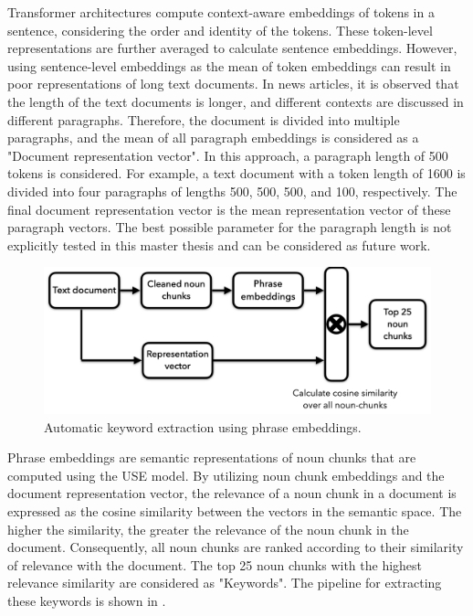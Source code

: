 Transformer architectures compute context-aware embeddings of tokens in a sentence, considering the order and identity of the tokens. These token-level representations are further averaged to calculate sentence embeddings. However, using sentence-level embeddings as the mean of token embeddings can result in poor representations of long text documents. In news articles, it is observed that the length of the text documents is longer, and different contexts are discussed in different paragraphs. Therefore, the document is divided into multiple paragraphs, and the mean of all paragraph embeddings is considered as a "Document representation vector". In this approach, a paragraph length of 500 tokens is considered. For example, a text document with a token length of 1600 is divided into four paragraphs of lengths 500, 500, 500, and 100, respectively. The final document representation vector is the mean representation vector of these paragraph vectors. The best possible parameter for the paragraph length is not explicitly tested in this master thesis and can be considered as future work.



\begin{figure}[h]
	\centering
	\includegraphics[width=.9\textwidth]{images/thesis_images/keyword_extraction.png}
	\caption[Contextualized automatic keyword extraction.]{Automatic keyword extraction using phrase embeddings. \label{fig:keyword_extraction}}
\end{figure}


Phrase embeddings are semantic representations of noun chunks that are computed using the \ac{USE} model. By utilizing noun chunk embeddings and the document representation vector, the relevance of a noun chunk in a document is expressed as the cosine similarity between the vectors in the semantic space. The higher the similarity, the greater the relevance of the noun chunk in the document. Consequently, all noun chunks are ranked according to their similarity of relevance with the document. The top 25 noun chunks with the highest relevance similarity are considered as "Keywords". The pipeline for extracting these keywords is shown in .


